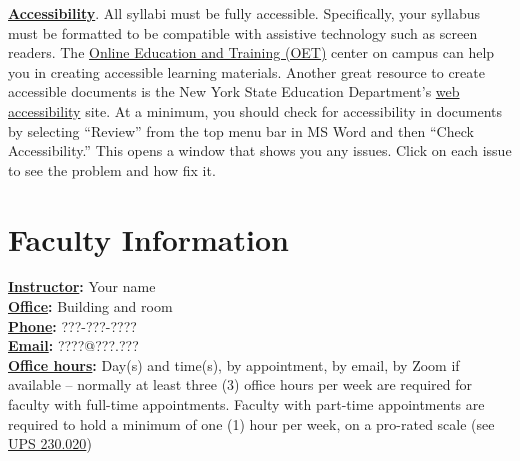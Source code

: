 \documentclass[12pt]{article}
\begin{document}
\vspace{1em}

\noindent\textbf{\underline{Accessibility}}. All syllabi must be fully accessible. Specifically, your syllabus must be formatted to be compatible with assistive technology such as screen readers. The \href{https://oet.fullerton.edu/}{Online Education and Training (OET)} center on campus can help you in creating accessible learning materials. Another great resource to create accessible documents is the New York State Education Department's \href{http://www.nysed.gov/webaccess}{web accessibility} site. At a minimum, you should check for accessibility in documents by selecting ``Review'' from the top menu bar in MS Word and then ``Check Accessibility.'' This opens a window that shows you any issues. Click on each issue to see the problem and how fix it.

\vspace{1em}

\maketitle


\section*{Faculty Information}
\noindent \textbf{\underline{Instructor}:} Your name 
\vspace{0.5em} \\
\noindent \textbf{\underline{Office}:} Building and room
\vspace{0.5em} \\
\noindent \textbf{\underline{Phone}:} ???-???-????
\vspace{0.5em} \\
\noindent \textbf{\underline{Email}:} ????@???.???
\vspace{0.5em} \\ 
\noindent \textbf{\underline{Office hours}:} {\color{suggestionred}Day(s) and time(s), by appointment, by email, by Zoom if available} {\color{annotationblue}-- normally at least three (3) office hours per week are required for faculty with full-time appointments. Faculty with part-time appointments are required to hold a minimum of one (1) hour per week, on a pro-rated scale (see \href{https://www.fullerton.edu/senate/publications_policies_resolutions/ups/UPS\%20200/UPS\%20230.020.pdf}{UPS 230.020})}
\end{document}
